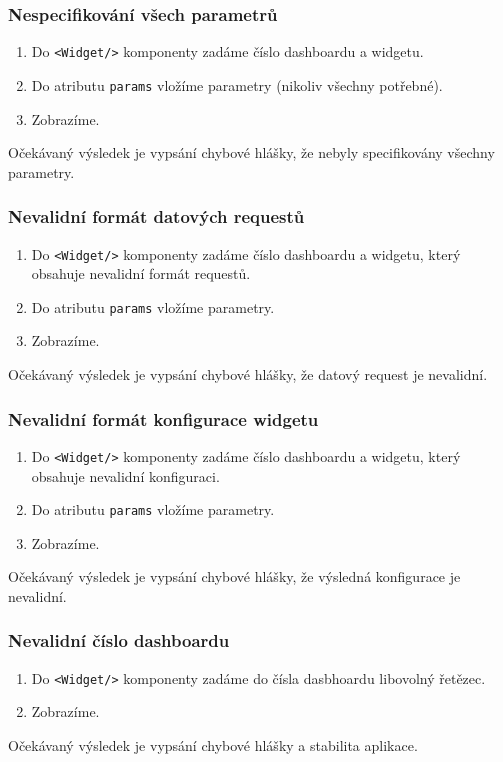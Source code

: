 \documentclass[czech, bc, kiv, he, iso690numb]{fasthesis}
\begin{document}
\subsubsection{Nespecifikování všech parametrů}
\begin{enumerate}
	\item Do \texttt{<Widget/>} komponenty zadáme číslo dashboardu a widgetu.
	\item Do atributu \texttt{params} vložíme parametry (nikoliv všechny potřebné).
	\item Zobrazíme.
\end{enumerate}
Očekávaný výsledek je vypsání chybové hlášky, že nebyly specifikovány všechny parametry.

\subsubsection{Nevalidní formát datových requestů}
\begin{enumerate}
	\item Do \texttt{<Widget/>} komponenty zadáme číslo dashboardu a widgetu, který obsahuje nevalidní formát requestů.
	\item Do atributu \texttt{params} vložíme parametry.
	\item Zobrazíme.
\end{enumerate}
Očekávaný výsledek je vypsání chybové hlášky, že datový request je nevalidní.

\subsubsection{Nevalidní formát konfigurace widgetu}
\begin{enumerate}
	\item Do \texttt{<Widget/>} komponenty zadáme číslo dashboardu a widgetu, který obsahuje nevalidní konfiguraci.
	\item Do atributu \texttt{params} vložíme parametry.
	\item Zobrazíme.
\end{enumerate}

Očekávaný výsledek je vypsání chybové hlášky, že výsledná konfigurace je nevalidní.

\subsubsection{Nevalidní číslo dashboardu}
\begin{enumerate}
	\item Do \texttt{<Widget/>} komponenty zadáme do čísla dasbhoardu libovolný řetězec.
	\item Zobrazíme.
\end{enumerate}
Očekávaný výsledek je vypsání chybové hlášky a stabilita aplikace.
\end{document}
